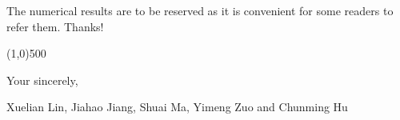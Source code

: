 \documentclass{letter}
\begin{document}
The numerical results are to be reserved as it is convenient for some readers to refer them. Thanks!


\line(1,0){500}



Your sincerely,

Xuelian Lin, Jiahao Jiang, Shuai Ma, Yimeng Zuo and Chunming Hu



%
%
\end{document}
